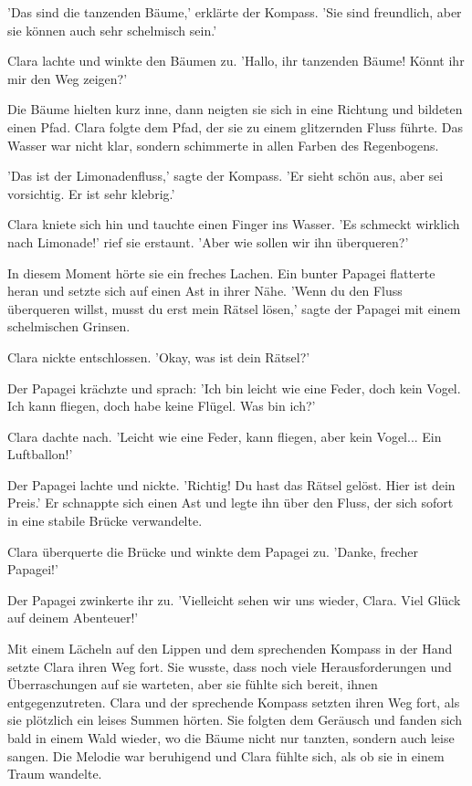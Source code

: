 \documentclass[12pt]{article}
\begin{document}
'Das sind die tanzenden Bäume,' erklärte der Kompass. 'Sie sind freundlich, aber sie können auch sehr schelmisch sein.'

Clara lachte und winkte den Bäumen zu. 'Hallo, ihr tanzenden Bäume! Könnt ihr mir den Weg zeigen?'

Die Bäume hielten kurz inne, dann neigten sie sich in eine Richtung und bildeten einen Pfad. Clara folgte dem Pfad, der sie zu einem glitzernden Fluss führte. Das Wasser war nicht klar, sondern schimmerte in allen Farben des Regenbogens.

'Das ist der Limonadenfluss,' sagte der Kompass. 'Er sieht schön aus, aber sei vorsichtig. Er ist sehr klebrig.'

Clara kniete sich hin und tauchte einen Finger ins Wasser. 'Es schmeckt wirklich nach Limonade!' rief sie erstaunt. 'Aber wie sollen wir ihn überqueren?'

In diesem Moment hörte sie ein freches Lachen. Ein bunter Papagei flatterte heran und setzte sich auf einen Ast in ihrer Nähe. 'Wenn du den Fluss überqueren willst, musst du erst mein Rätsel lösen,' sagte der Papagei mit einem schelmischen Grinsen.

Clara nickte entschlossen. 'Okay, was ist dein Rätsel?'

Der Papagei krächzte und sprach: 'Ich bin leicht wie eine Feder, doch kein Vogel. Ich kann fliegen, doch habe keine Flügel. Was bin ich?'

Clara dachte nach. 'Leicht wie eine Feder, kann fliegen, aber kein Vogel... Ein Luftballon!'

Der Papagei lachte und nickte. 'Richtig! Du hast das Rätsel gelöst. Hier ist dein Preis.' Er schnappte sich einen Ast und legte ihn über den Fluss, der sich sofort in eine stabile Brücke verwandelte.

Clara überquerte die Brücke und winkte dem Papagei zu. 'Danke, frecher Papagei!'

Der Papagei zwinkerte ihr zu. 'Vielleicht sehen wir uns wieder, Clara. Viel Glück auf deinem Abenteuer!'

Mit einem Lächeln auf den Lippen und dem sprechenden Kompass in der Hand setzte Clara ihren Weg fort. Sie wusste, dass noch viele Herausforderungen und Überraschungen auf sie warteten, aber sie fühlte sich bereit, ihnen entgegenzutreten. Clara und der sprechende Kompass setzten ihren Weg fort, als sie plötzlich ein leises Summen hörten. Sie folgten dem Geräusch und fanden sich bald in einem Wald wieder, wo die Bäume nicht nur tanzten, sondern auch leise sangen. Die Melodie war beruhigend und Clara fühlte sich, als ob sie in einem Traum wandelte.
\end{document}
